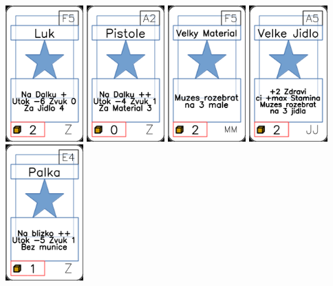 \documentclass[a4paper]{article}
\begin{document}
	\includegraphics[width=3.0cm]{img-1_89}
	\includegraphics[width=3.0cm]{img-1_91}
	\includegraphics[width=3.0cm]{img-1_59}
	\includegraphics[width=3.0cm]{img-1_34}
	\includegraphics[width=3.0cm]{img-1_83}
\end{document}
